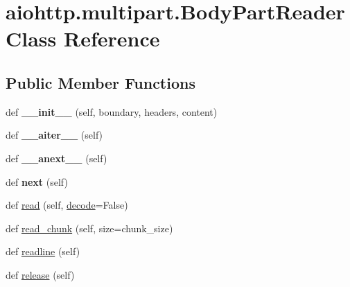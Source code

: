 \hypertarget{classaiohttp_1_1multipart_1_1_body_part_reader}{}\section{aiohttp.\+multipart.\+Body\+Part\+Reader Class Reference}
\label{classaiohttp_1_1multipart_1_1_body_part_reader}
\subsection*{Public Member Functions}
\begin{DoxyCompactItemize}
\item 
\mbox{\label{classaiohttp_1_1multipart_1_1_body_part_reader_abe6b30e692a7c579ca64976d8a8ceb9b}} 
def {\bfseries \+\_\+\+\_\+init\+\_\+\+\_\+} (self, boundary, headers, content)
\item 
\mbox{\label{classaiohttp_1_1multipart_1_1_body_part_reader_ac621b3047b3ccf545c6675f96a9a5d0f}} 
def {\bfseries \+\_\+\+\_\+aiter\+\_\+\+\_\+} (self)
\item 
\mbox{\label{classaiohttp_1_1multipart_1_1_body_part_reader_a83c26769ba3a9cc70f63ce23837ee15b}} 
def {\bfseries \+\_\+\+\_\+anext\+\_\+\+\_\+} (self)
\item 
\mbox{\label{classaiohttp_1_1multipart_1_1_body_part_reader_ae04000c21ebd939afb16e2f3106e538b}} 
def {\bfseries next} (self)
\item 
def \hyperlink{classaiohttp_1_1multipart_1_1_body_part_reader_a51ce7158a5d803ce9e53f177fa96bb8c}{read} (self, \hyperlink{classaiohttp_1_1multipart_1_1_body_part_reader_a97f00c080c7c84423636e182e7638706}{decode}=False)
\item 
def \hyperlink{classaiohttp_1_1multipart_1_1_body_part_reader_afb299e0e44d0b6bb95aeb5c1709121a4}{read\+\_\+chunk} (self, size=chunk\+\_\+size)
\item 
def \hyperlink{classaiohttp_1_1multipart_1_1_body_part_reader_a21ae160be9e586ccc7df7b468216db44}{readline} (self)
\item 
def \hyperlink{classaiohttp_1_1multipart_1_1_body_part_reader_a23130082f378478f6da9e09168c34a11}{release} (self)

\end{DoxyCompactItemize}
